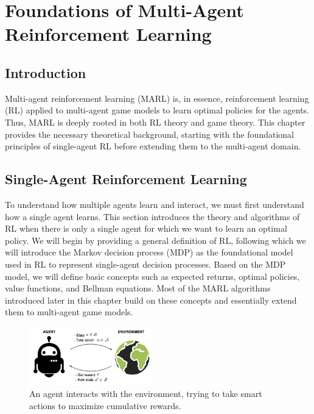 \chapter{Foundations of Multi-Agent Reinforcement Learning}

\section*{Introduction}
Multi-agent reinforcement learning (MARL) is, in essence, reinforcement learning (RL) applied to multi-agent game models to learn optimal policies for the agents. Thus, MARL is deeply rooted in both RL theory and game theory. This chapter provides the necessary theoretical background, starting with the foundational principles of single-agent RL before extending them to the multi-agent domain.

\section{Single-Agent Reinforcement Learning}
To understand how multiple agents learn and interact, we must first understand how a single agent learns. This section introduces the theory and algorithms of RL when there is only a single agent for which we want to learn an optimal policy. We will begin by providing a general definition of RL, following which we will introduce the Markov decision process (MDP) as the foundational model used in RL to represent single-agent decision processes. Based on the MDP model, we will define basic concepts such as expected returns, optimal policies, value functions, and Bellman equations. Most of the MARL algorithms introduced later in this chapter build on these concepts and essentially extend them to multi-agent game models.
\begin{figure}[h!]
    \centering
     \includegraphics[width=0.48\textwidth]{img_pfe/RL_illustration.png}
    \caption{An agent interacts with the environment, trying to take smart actions to maximize cumulative rewards.}
    \label{fig:rl}
\end{figure}

